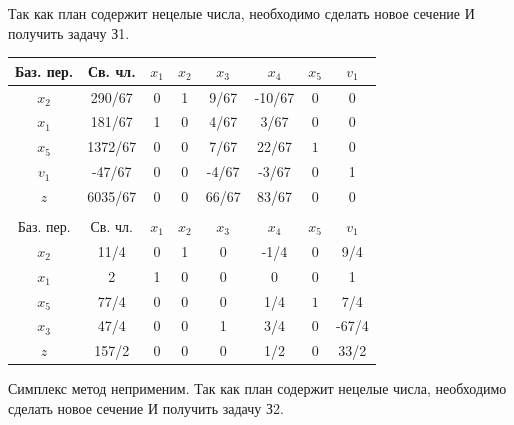 \documentclass[a4paper,14pt]{extarticle}
\begin{document}
Так как план содержит нецелые числа, необходимо сделать новое сечение
И получить задачу З1.
\begin{center}
    \begin{longtable}{|c|c|c|c|c|c|c|c|}
        \hline
        Баз. пер. & Св. чл. & $x_1$ & $x_2$ & $x_3$ & $x_4 $ & $x_5$ & $v_1$ \\
        \hline
        $x_2$     & 290/67  & 0     & 1     & 9/67  & -10/67 & $0$   & 0     \\
        \hline
        $x_1$     & 181/67  & 1     & 0     & 4/67  & 3/67   & $0$   & 0     \\
        \hline
        $x_5$     & 1372/67 & 0     & 0     & 7/67  & 22/67  & $1$   & 0     \\
        \hline
        $v_1$     & -47/67  & 0     & 0     & -4/67 & -3/67  & 0     & 1     \\
        \hline
        $z$       & 6035/67 & 0     & 0     & 66/67 & 83/67  & 0     & 0     \\
        \hline
        \multicolumn{8}{c}{}\\
        \hline
        Баз. пер. & Св. чл. & $x_1$ & $x_2$ & $x_3$ & $x_4 $ & $x_5$ & $v_1$ \\
        \hline
        $x_2$     & 11/4    & 0     & 1     & 0     & -1/4   & $0$   & 9/4     \\
        \hline
        $x_1$     & 2       & 1     & 0     & 0     & 0      & $0$   & 1     \\
        \hline
        $x_5$     & 77/4    & 0     & 0     & 0     & 1/4    & $1$   & 7/4     \\
        \hline
        $x_3$     & 47/4    & 0     & 0     & 1     & 3/4    & 0     & -67/4     \\
        \hline
        $z$       & 157/2   & 0     & 0     & 0     & 1/2    & $0$  & 33/2     \\
        \hline
    \end{longtable}
\end{center}
Симплекс метод неприменим.
Так как план содержит нецелые числа, необходимо сделать новое сечение
И получить задачу З2.
\end{document}
